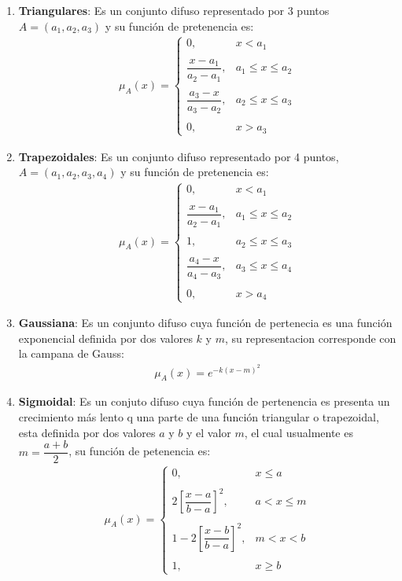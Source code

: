 \documentclass[a4paper,10pt,twocolumn]{article}
\begin{document}
\begin{enumerate}
	\item \textbf{Triangulares}: Es un conjunto difuso representado por 3 puntos $A = (a_1, a_2, a_3)$ y su funci\'on de pretenencia es:
		\begin{align*}
			\mu_A (x) = \begin{cases}
				0, & x < a_1 \\\\
				\dfrac{x - a_1}{a_2 - a_1}, & a_1 \leq x \leq a_2 \\\\
				\dfrac{a_3 - x}{a_3 - a_2}, & a_2 \leq x \leq a_3 \\\\
				0, & x > a_3
			\end{cases}
		\end{align*}
		
	\item \textbf{Trapezoidales}: Es un conjunto difuso representado por 4 puntos, $A = (a_1, a_2, a_3, a_4) $ y su funci\'on de pretenencia es:
		\begin{align*}
		\mu_A (x) = \begin{cases}
			0, & x < a_1 \\\\
			\dfrac{x - a_1}{a_2 - a_1}, & a_1 \leq x \leq a_2 \\\\
			1, & a_2 \leq x \leq a_3 \\\\
			\dfrac{a_4 - x}{a_4 - a_3}, & a_3 \leq x \leq a_4 \\\\
			0, & x > a_4
		\end{cases}
		\end{align*}
	
	\item \textbf{Gaussiana}: Es un conjunto difuso cuya funci\'on de pertenecia es una funci\'on exponencial definida por dos valores $k$ y $m$, su representacion corresponde con la campana de Gauss:
		\begin{align*}
			\mu_A (x) = e^{-k(x-m)^{2}}
		\end{align*}
	
	\item \textbf{Sigmoidal}: Es un conjuto difuso cuya funci\'on de pertenencia es presenta un crecimiento m\'as lento q una parte de una funci\'on triangular o trapezoidal, esta definida por dos valores $a$ y $b$ y el valor $m$, el cual usualmente es $m = \dfrac{a + b}{2}$, su funci\'on de petenencia es:
		\begin{align*}
			\mu_A (x) = \begin{cases}
				0, & x \leq a \\\\
				2\left[ \dfrac{x - a}{b - a}
				\right]^{2}, & a < x \leq m	 \\\\
				1 - 2 \left[
				\dfrac{x - b}{b - a}
				\right]^{2}, & m < x < b \\\\
				1, & x \geq b
			\end{cases}
		\end{align*}
\end{enumerate}
\end{document}
